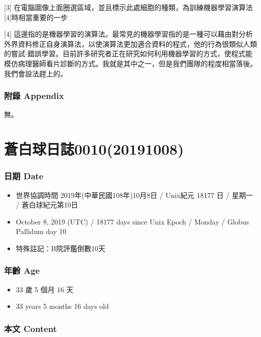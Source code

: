\documentclass[a5paper, 12pt
]{book}
\providecommand{\tightlist}{%
  \setlength{\itemsep}{0pt}\setlength{\parskip}{0pt}}
\begin{document}
{[}3{]}
在電腦圖像上面圈選區域，並且標示此處細胞的種類，為訓練機器學習演算法{[}4{]}時相當重要的一步

{[}4{]}
這邊指的是機器學習的演算法。最常見的機器學習指的是一種可以藉由對分析外界資料修正自身演算法，以使演算法更加適合資料的程式，他的行為很類似人類的嘗試-錯誤學習。目前許多研究者正在研究如何利用機器學習的方式，使程式能模仿病理醫師看片診斷的方式。我就是其中之一，但是我們團隊的程度相當落後。我們會設法趕上的。

\hypertarget{ux9644ux9304-appendix-2}{%
\subsubsection{附錄 Appendix}\label{ux9644ux9304-appendix-2}}

無。

\hypertarget{ux84bcux767dux7403ux65e5ux8a8c001020191008}{%
\section{蒼白球日誌0010(20191008)}\label{ux84bcux767dux7403ux65e5ux8a8c001020191008}}

\hypertarget{ux65e5ux671f-date-9}{%
\subsubsection{日期 Date}\label{ux65e5ux671f-date-9}}

\begin{itemize}
\tightlist
\item
  世界協調時間 2019年(中華民國108年)10月8日 / Unix紀元 18177 日 / 星期一
  / 蒼白球紀元第10日
\item
  October 8, 2019 (UTC) / 18177 days since Unix Epoch / Monday / Globus
  Pallidum day 10
\item
  特殊註記：B院評鑑倒數10天
\end{itemize}

\hypertarget{ux5e74ux9f61-age-9}{%
\subsubsection{年齡 Age}\label{ux5e74ux9f61-age-9}}

\begin{itemize}
\tightlist
\item
  33 歲 5 個月 16 天
\item
  33 years 5 months 16 days old
\end{itemize}

\hypertarget{ux672cux6587-content-9}{%
\subsubsection{本文 Content}\label{ux672cux6587-content-9}}
\end{document}
